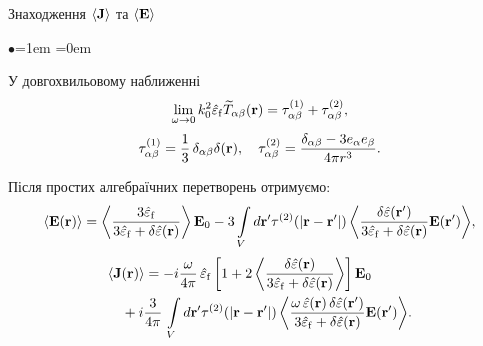\documentclass[10pt]{beamer}
\begin{document}
\begin{frame}{Знаходження $\langle {\bf J} \rangle$ та $\langle {\bf E} \rangle$}
\footnotesize

\begin{list}{$\bullet$}{\leftmargin=1em \itemindent=0em}
\item
У довгохвильовому наближенні 
\begin{equation} \label{representationZerofrequency}
\lim_{\omega \to 0} k_{0}^2 \hat{\varepsilon}_{\rm f} {\widetilde
T}_{\alpha\beta} ({\rm {\bf r}}) = \tau^{(1)}_{\alpha\beta}+
\tau^{(2)}_{\alpha\beta},
\end{equation}
\begin{equation} \label{representationZerofrequencyParts}
\tau^{(1)}_{\alpha\beta}= \frac{1}{3}\,\delta _{\alpha\beta}
\delta ({\rm {\bf r}}), \quad \tau^{(2)}_{\alpha\beta} = \frac{
{\delta _{\alpha\beta} - 3e_{\alpha} e_{\beta}}}{4\pi r^3}.
\end{equation}

\item
Після простих алгебраїчних перетворень отримуємо:
\begin{equation}\label{eq:Eaveraged}
\begin{split}
\langle \mathbf{E} (\mathbf{r}) \rangle = \left\langle \frac{ 3
\hat{\varepsilon}_{\rm f}  }{3 \hat{\varepsilon}_{\rm f}
+ \delta\hat{\varepsilon}({\bf r})} \right\rangle \mathbf{E}_0 
- 3 \int\limits_V {d{\mathbf{r}}'} { {\rm \tau}^{(2)} (| {\bf r}
- {\bf r}' |) \left\langle \frac{\delta \hat{\varepsilon}
({\mathbf{r}}')}{3 \hat{\varepsilon}_{\rm f} + \delta
\hat{\varepsilon}({\bf r})}{\mathbf{E}}({\mathbf{r}}')
\right\rangle },
\end{split}
\end{equation}
\begin{equation}\label{eq:Caveraged}
\begin{split}
\langle \mathbf{J} & (\mathbf{r}) \rangle = -i \frac{\omega}{4\pi}
\, \hat{\varepsilon}_{\rm f}\left[1+ 2\left\langle \frac{
\delta\hat{\varepsilon}({\bf r}) }{3 \hat{\varepsilon}_{\rm f}
+ \delta\hat{\varepsilon}({\bf r})} \right\rangle \right] \mathbf{E}_0 \\
&+i \frac{3}{4\pi}\,  \int\limits_V {d{\mathbf{r}}'} {
{\rm \tau}^{(2)} (| {\bf r} - {\bf r}' |) \left\langle
\frac{\omega\, \hat{\varepsilon}({\bf r}) \,\delta
\hat{\varepsilon} ({\mathbf{r}}')}{3 \hat{\varepsilon}_{\rm f} +
\delta \hat{\varepsilon}({\bf r})}{\mathbf{E}}({\mathbf{r}}')
\right\rangle }.
\end{split}
\end{equation}


\end{list}
\end{frame}
\end{document}
